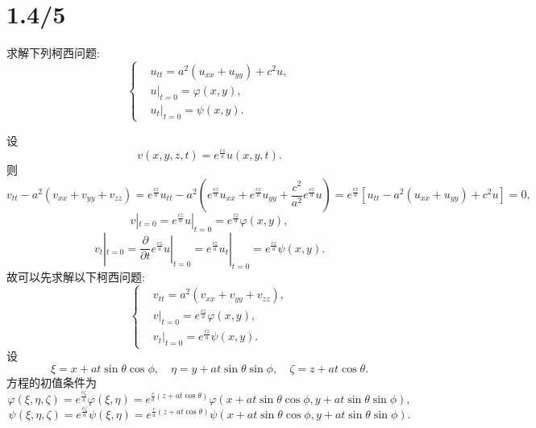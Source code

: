 \documentclass[11pt,a4paper]{article}
\begin{document}
\section{1.4/5}
\begin{problem}
求解下列柯西问题:
$$\left\{\begin{aligned}
     & u_{tt}=a^2(u_{xx}+u_{yy})+c^2u, \\
     & u|_{t=0}=\varphi(x,y),          \\
     & u_t|_{t=0}=\psi(x,y).
  \end{aligned}\right.$$
\end{problem}

设$$v(x,y,z,t)=e^{\frac{cz}{a}}u(x,y,t).$$
则$$v_{tt}-a^2(v_{xx}+v_{yy}+v_{zz})=e^{\frac{cz}{a}}u_{tt}-a^2\left(e^{\frac{cz}{a}}u_{xx}+e^{\frac{cz}{a}}u_{yy}+\frac{c^2}{a^2}e^{\frac{cz}{a}}u\right)=e^{\frac{cz}{a}}\left[u_{tt}-a^2(u_{xx}+u_{yy})+c^2u\right]=0,$$
$$v|_{t=0}=e^{\frac{cz}{a}}u|_{t=0}=e^{\frac{cz}{a}}\varphi(x,y),$$
$$v_t|_{t=0}=\left.\frac{\partial}{\partial t}e^{\frac{cz}{a}}u\right|_{t=0}=e^{\frac{cz}{a}}u_t|_{t=0}=e^{\frac{cz}{a}}\psi(x,y).$$
故可以先求解以下柯西问题:
$$\left\{\begin{aligned}
     & v_{tt}=a^2(v_{xx}+v_{yy}+v_{zz}),      \\
     & v|_{t=0}=e^{\frac{cz}{a}}\varphi(x,y), \\
     & v_t|_{t=0}=e^{\frac{cz}{a}}\psi(x,y).
  \end{aligned}\right.$$
设
$$\xi=x+at\sin\theta\cos\phi,\quad \eta=y+at\sin\theta\sin\phi,\quad \zeta=z+at\cos\theta.$$
方程的初值条件为
$$\varphi(\xi,\eta,\zeta)=e^{\frac{c\zeta}{a}}\varphi(\xi,\eta)=e^{\frac{c}{a}(z+at\cos\theta)}\varphi(x+at\sin\theta\cos\phi,y+at\sin\theta\sin\phi),$$
$$\psi(\xi,\eta,\zeta)=e^{\frac{c\zeta}{a}}\psi(\xi,\eta)=e^{\frac{c}{a}(z+at\cos\theta)}\psi(x+at\sin\theta\cos\phi,y+at\sin\theta\sin\phi).$$
\end{document}
